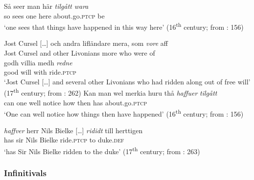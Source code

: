 \documentclass[output=paper]{langscibook}
\begin{document}
\ea\label{ex:intro:8}
\ea\label{ex:intro:8a}
\gll  Så seer   man   här \textit{tilgått} \textit{wara} \\
so   sees   one     here   about.go\textsc{.ptcp}     be\\
\glt ‘one sees that things have happened in this way here’ (16\textsuperscript{th} century; from  \citealt{Larsson2009}: 156)


\ex\label{ex:intro:8b}
\gll  Jost Cursel […] och andra   lifländare mera,   som \textit{vore} aff\\
      Jost Cursel  {}   and other   Livonians more   who   were   of \\

\gll  godh   villia medh \textit{redne}\\
      good   will   with   ride.\textsc{ptcp}\\
    \glt `Jost Cursel […] and several other Livonians who had ridden along out of free will’ (17\textsuperscript{th} century; from \citealt{Larsson2009}: 262)
\z
\ex\label{ex:intro:9}
\ea\label{ex:intro:9a}
\gll  Kan   man   wel   merkia huru thå \textit{haffuer} \textit{tilgått} \\
can       one   well   notice   how   then     has         about.go\textsc{.ptcp}\\
\glt      ‘One can well notice how things then have happened’ (16\textsuperscript{th} century; from  \citealt{Larsson2009}: 156)

\ex\label{ex:intro:9b}
\gll \textit{haffver} herr   Nils   Bielke […] \textit{rididt} till   herttigen\\
      has              sir   Nils   Bielke   {}  ride.\textsc{ptcp}   to    duke.\textsc{def}\\
    \glt `has Sir Nils Bielke ridden to the duke’ (17\textsuperscript{th} century; from \citealt{Larsson2009}: 263)
\z
\z

\subsubsection{ Infinitivals}\label{sec:intro:3.1.3}
\end{document}
